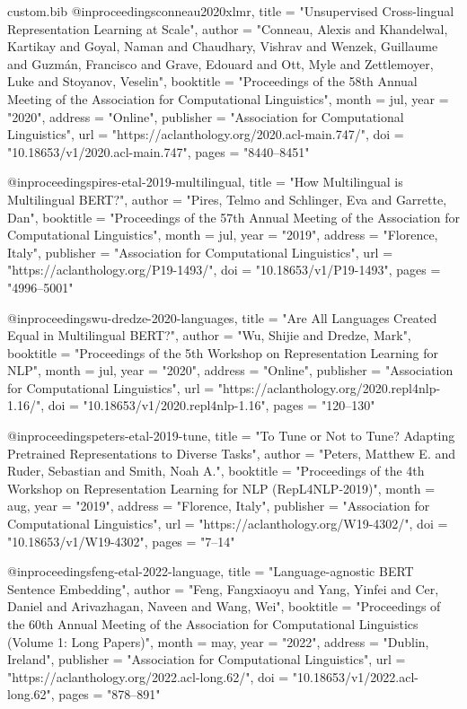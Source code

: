 \begin{filecontents*}[overwrite]{custom.bib}
@inproceedings{conneau2020xlmr,
    title     = "Unsupervised Cross-lingual Representation Learning at Scale",
    author    = "Conneau, Alexis  and
      Khandelwal, Kartikay  and
      Goyal, Naman  and
      Chaudhary, Vishrav  and
      Wenzek, Guillaume  and
      Guzm{\'a}n, Francisco  and
      Grave, Edouard  and
      Ott, Myle  and
      Zettlemoyer, Luke  and
      Stoyanov, Veselin",
    booktitle = "Proceedings of the 58th Annual Meeting of the Association for Computational Linguistics",
    month     = jul,
    year      = "2020",
    address   = "Online",
    publisher = "Association for Computational Linguistics",
    url       = "https://aclanthology.org/2020.acl-main.747/",
    doi       = "10.18653/v1/2020.acl-main.747",
    pages     = "8440--8451"
}

@inproceedings{pires-etal-2019-multilingual,
    title = "How Multilingual is Multilingual {BERT}?",
    author = "Pires, Telmo  and
      Schlinger, Eva  and
      Garrette, Dan",
    booktitle = "Proceedings of the 57th Annual Meeting of the Association for Computational Linguistics",
    month = jul,
    year = "2019",
    address = "Florence, Italy",
    publisher = "Association for Computational Linguistics",
    url = "https://aclanthology.org/P19-1493/",
    doi = "10.18653/v1/P19-1493",
    pages = "4996--5001"
}

@inproceedings{wu-dredze-2020-languages,
    title = "Are All Languages Created Equal in Multilingual {BERT}?",
    author = "Wu, Shijie  and
      Dredze, Mark",
    booktitle = "Proceedings of the 5th Workshop on Representation Learning for NLP",
    month = jul,
    year = "2020",
    address = "Online",
    publisher = "Association for Computational Linguistics",
    url = "https://aclanthology.org/2020.repl4nlp-1.16/",
    doi = "10.18653/v1/2020.repl4nlp-1.16",
    pages = "120--130"
}

@inproceedings{peters-etal-2019-tune,
    title = "To Tune or Not to Tune? Adapting Pretrained Representations to Diverse Tasks",
    author = "Peters, Matthew E.  and
      Ruder, Sebastian  and
      Smith, Noah A.",
    booktitle = "Proceedings of the 4th Workshop on Representation Learning for NLP (RepL4NLP-2019)",
    month = aug,
    year = "2019",
    address = "Florence, Italy",
    publisher = "Association for Computational Linguistics",
    url = "https://aclanthology.org/W19-4302/",
    doi = "10.18653/v1/W19-4302",
    pages = "7--14"
}

@inproceedings{feng-etal-2022-language,
    title     = "Language-agnostic {BERT} Sentence Embedding",
    author    = "Feng, Fangxiaoyu  and
      Yang, Yinfei  and
      Cer, Daniel  and
      Arivazhagan, Naveen  and
      Wang, Wei",
    booktitle = "Proceedings of the 60th Annual Meeting of the Association for Computational Linguistics (Volume 1: Long Papers)",
    month     = may,
    year      = "2022",
    address   = "Dublin, Ireland",
    publisher = "Association for Computational Linguistics",
    url       = "https://aclanthology.org/2022.acl-long.62/",
    doi       = "10.18653/v1/2022.acl-long.62",
    pages     = "878--891"
}


\end{filecontents*}
